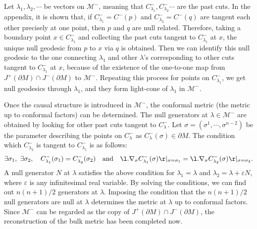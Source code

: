 \documentclass[12pt]{article}
\begin{document}
Let $\lambda_1,\lambda_2,\cdots$ be vectors on $\mathcal M^-$, meaning that $C^-_{\lambda_1},C^-_{\lambda_2}\cdots$ are the past cuts.
In the appendix, it is shown that, if $C^-_{\lambda_1} = C^-(p)$ and $C_{\lambda_2}^- = C^-(q)$ are tangent each other precisely at one point, then $p$ and $q$ are null related.
Therefore, taking a boundary point $x \in C^-_{\lambda_1}$ and collecting the past cuts tangent to $C^-_{\lambda_1}$ at $x$, the unique null geodesic from $p$ to $x$ via $q$ is obtained.
Then we can identify this null geodesic to the one connecting $\lambda_1$ and other $\lambda$'s corresponding to other cuts tangent to $C^-_{\lambda_1}$ at $x$, because of the existence of the one-to-one map from $J^+(\partial M)\cap J^-(\partial M)$ to $\mathcal M^-$.
Repeating this process for points on $C^-_{\lambda_1}$, we get null geodesics through $\lambda_1$, and they form light-cone of $\lambda_1$ in $\mathcal M^-$.

Once the causal structure is introduced in $\mathcal M^-$, the conformal metric (the metric up to conformal factors) can be determined.
The null generators at $\lambda\in \mathcal M^-$ are obtained by looking for other past cuts tangent to $C^-_{\lambda}$.
Let $\sigma = (\sigma^1,\cdots,\sigma^{n-2})$ be the parameter describing the points on $C^-_{\lambda}$ as $C^-_{\lambda}(\sigma) \in \partial M$.
The condition which $C^-_{\lambda_2}$ is tangent to $C^-_{\lambda_1}$ is as follows:
\begin{align}
	\exists\sigma_1,~\exists\sigma_2,\quad C^-_{\lambda_1}(\sigma_1) = C^-_{\lambda_2}(\sigma_2)\quad\mathrm{and}\quad \l.\nabla_{\sigma} C^-_{\lambda_1}(\sigma)\r|_{\sigma = \sigma_1} = \l.\nabla_{\sigma} C^-_{\lambda_2}(\sigma) \r|_{\sigma = \sigma_2}.
\end{align}
A null generator $N$ at $\lambda$ satisfies the above condition for $\lambda_1 = \lambda$ and $\lambda_2 = \lambda + \varepsilon N$, where $\varepsilon$ is any infinitesimal real variable.
By solving the conditions, we can find out $n(n+1)/2$ generators at $\lambda$.
Imposing the condition that the $n(n+1)/2$ null generators are null at $\lambda$ determines the metric at $\lambda$ up to conformal factors.
Since $\mathcal M^-$ can be regarded as the copy of $J^+(\partial M)\cap J^-(\partial M)$, the reconstruction of the bulk metric has been completed now.


 

\end{document}
